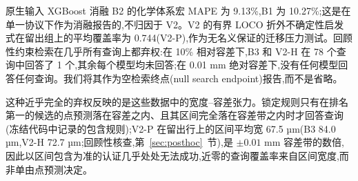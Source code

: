 \documentclass[11pt,a4paper]{ctexart}
\begin{document}
原生输入 XGBoost 消融 B2 的化学体系宏 MAPE 为 9.13\%,B1 为 10.27\%;这是在单一协议下作为消融报告的,不归因于 V2。V2 的有界 LOCO 折外不确定性启发式在留出组上的平均覆盖率为 0.744(V2-P),作为无名义保证的迁移压力测试。回顾性约束检索在几乎所有查询上都弃权:在 10\% 相对容差下,B3 和 V2-H 在 78 个查询中回答了 1 个,其余每个模型均未回答;在 0.01 mm 绝对容差下,没有任何模型回答任何查询。我们将其作为空检索终点(null search endpoint)报告,而不是省略。

这种近乎完全的弃权反映的是这些数据中的宽度–容差张力。锁定规则只有在排名第一的候选的点预测落在容差之内、且其区间完全落在容差带之内时才回答查询(冻结代码中记录的包含规则);V2-P 在留出行上的区间平均宽 67.5 µm(B3 84.0 µm,V2-H 72.7 µm;回顾性核查,第~\ref{sec:posthoc}~节),是 $\pm 0.01$ mm 容差带的数倍,因此以区间包含为准的认证几乎处处无法成功,近零的查询覆盖率来自区间宽度,而非单由点预测决定。

\begin{table}[t]
\centering\small
\caption{嵌套留一化学体系评估下冻结的 V2 模型矩阵(466 行,六个组,五个种子;TX100 为揭盲后回顾性)。}
\label{tab:v2}
\end{table}
\end{document}
